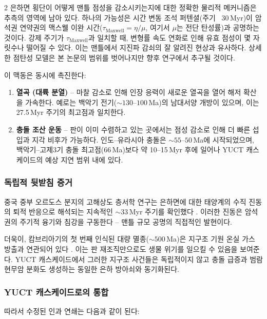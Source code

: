 \documentclass[12pt,a4paper]{article}
\begin{document}
\begin{multicols}{2}
		은하면 횡단이 어떻게 맨틀 점성을 감소시키는지에 대한 정확한 물리적 메커니즘은 추측의 영역에 남아 있다. 하나의 가능성은 시간 변동 조석 퍼텐셜(주기 ~30 Myr)이 암석권 연약권의 맥스웰 이완 시간(\(\tau_{\mathrm{Maxwell}} = \eta/\mu\), 여기서 \(\mu\)는 전단 탄성률)과 공명하는 것이다. 강제 주기가 \(\tau_{\mathrm{Maxwell}}\)과 일치할 때, 변형률 속도 연화로 인해 유효 점성이 몇 자릿수나 떨어질 수 있다. 이는 맨틀에서 지진파 감쇠의 잘 알려진 현상과 유사하다. 상세한 점탄성 모델은 본 논문의 범위를 벗어나지만 향후 연구에서 추구될 것이다.
		
		이 맥동은 동시에 촉진한다:
		\begin{enumerate}
			\item \textbf{열곡 (대륙 분열)} – 마찰 감소로 인해 인장 응력이 새로운 열곡을 열어 해저 확산을 가속한다. 예로는 백악기 전기(\(\sim 130\)–\(100\) Ma)의 남대서양 개방이 있으며, 이는 27.5 Myr 주기의 최고점과 일치한다.
			\item \textbf{충돌 조산 운동} – 판이 이미 수렴하고 있는 곳에서는 점성 감소로 인해 더 빠른 섭입과 지각 비후가 가능하다. 인도–유라시아 충돌은 \(\sim 55\)–\(50\) Ma에 시작되었으며, 백악기–고제3기 충돌 최고점(66 Ma)보다 약 10–15 Myr 후에 일어나 YUCT 캐스케이드의 예상 지연 범위 내에 있다.
		\end{enumerate}
		
		\subsubsection{독립적 뒷받침 증거}
		중국 중부 오르도스 분지의 고해상도 층서학 연구는 은하면에 대한 태양계의 수직 진동의 퇴적 반응으로 해석되는 지속적인 \(\sim 33\) Myr 주기를 확인했다 \cite{Rampino2021}. 이러한 진동은 암석권의 주기적 융기와 침강을 구동한다 – 맨틀 규모 공명의 직접적인 발현이다.
		
		더욱이, 캄브리아기의 첫 번째 인식된 대량 멸종(\(\sim 500\) Ma)은 지구조 기원 온실 가스 방출과 연관되어 있다 \cite{Jablonski1991}. 이는 판 재조직만으로도 생물 위기를 일으킬 수 있음을 보여준다. YUCT 캐스케이드에서 그러한 지구조 사건들은 독립적이지 않고 충돌 급증과 범람 현무암 분화도 생성하는 동일한 은하 방아쇠와 동기화된다.
		
		\subsubsection{YUCT 캐스케이드로의 통합}
		따라서 수정된 인과 연쇄는 다음과 같이 된다:
		
	\end{multicols}
	
\end{document}
